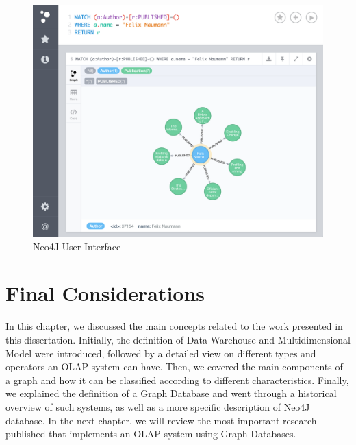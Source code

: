 \begin{figure}[ht]
\centering
\includegraphics[width=1\textwidth]{../neo4j_user_interface.png}
\caption{Neo4J User Interface}
\label{fig:figure31}
\end{figure}


\section{Final Considerations}
In this chapter, we discussed the main concepts related to the work presented in this dissertation. Initially, the definition of Data Warehouse and Multidimensional Model were introduced, followed by a detailed view on different types and operators an OLAP system can have. Then, we covered the main components of a graph and how it can be classified according to different characteristics. Finally, we explained the definition of a Graph Database and went through a historical overview of such systems, as well as a more specific description of Neo4J database. In the next chapter, we will review the most important research published that implements an OLAP system using Graph Databases.
